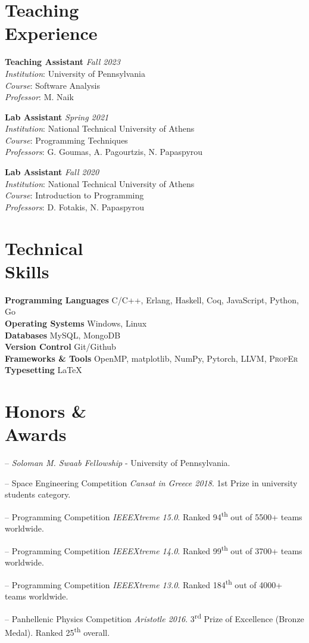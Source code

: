 \documentclass[margin]{res}
\newcommand{\field}[2]{\noindent \textbf{#1} \hfill #2 \\}
\begin{document}
\begin{resume}
\section{Teaching \\ Experience}

\field{Teaching Assistant}{\emph{Fall 2023}}
\textit{Institution}: University of Pennsylvania \\
\textit{Course}: Software Analysis \\
\textit{Professor}: M. Naik

\field{Lab Assistant}{\emph{Spring 2021}}
\textit{Institution}: National Technical University of Athens \\
\textit{Course}: Programming Techniques \\
\textit{Professors}: G. Goumas, A. Pagourtzis, N. Papaspyrou

\field{Lab Assistant}{\emph{Fall 2020}}
\textit{Institution}: National Technical University of Athens \\
\textit{Course}: Introduction to Programming \\
\textit{Professors}: D. Fotakis, N. Papaspyrou

\section{Technical \\ Skills}

\field{Programming Languages}  {C/C++, Erlang, Haskell, Coq, JavaScript, Python, Go}
\field{Operating Systems} {Windows, Linux}
\field{Databases} {MySQL, MongoDB}
\field{Version Control} {Git/Github}
\field{Frameworks \& Tools} {OpenMP, matplotlib, NumPy, Pytorch, LLVM, \textsc{PropEr}}
\field{Typesetting} {\LaTeX}

\section{Honors \& \\ Awards} 

\begin{compactitem}
  \item[--] 
    \emph{Soloman M. Swaab Fellowship} - University of Pennsylvania.
	\item[--] 
    Space Engineering Competition \emph{Cansat in Greece 2018}.
    1st Prize in university students category.
  \item[--] 
    Programming Competition \emph{IEEEXtreme 15.0}.
    Ranked 94\textsuperscript{th} out of 5500+ teams worldwide.
  \item[--] 
    Programming Competition \emph{IEEEXtreme 14.0}.
    Ranked 99\textsuperscript{th} out of 3700+ teams worldwide.
  \item[--] 
    Programming Competition \emph{IEEEXtreme 13.0}.
    Ranked 184\textsuperscript{th} out of 4000+ teams worldwide.
  \item[--] 
    Panhellenic Physics Competition \emph{Aristotle 2016}.
    3\textsuperscript{rd} Prize of Excellence (Bronze Medal). 
    Ranked 25\textsuperscript{th} overall.
\end{compactitem}


\end{resume}
\end{document}
